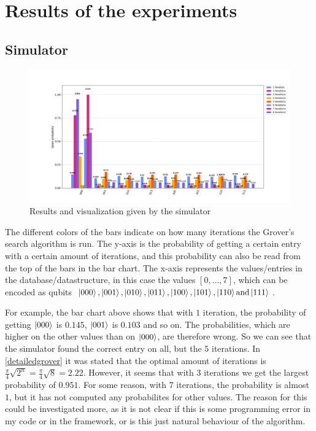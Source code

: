 \documentclass[english,oneside,openright]{UH_DS_report}
\begin{document}
\section{Results of the experiments}
\label{Allresults}

\subsection{Simulator}
\label{simulator}
\begin{figure}[h]
\caption{Results and visualization given by the simulator}
\centering
\includegraphics[width=\linewidth]{images/simulator/Figure_1.png}
\end{figure}

The different colors of the bars indicate on how many iterations the Grover's search algorithm is run. The y-axis is the probability of getting a certain entry with a certain amount of iterations, and this probability can also be read from the top of the bars in the bar chart. The x-axis represents the values/entries in the database/datastructure, in this case the values $[0,\ldots,7]$, which can be encoded as qubits $\ket{000}, \ket{001}, \ket{010}, \ket{011}, \ket{100}, \ket{101}, \ket{110} \text{and} \ket{111}$.

For example, the bar chart above shows that with $1$ iteration, the probability of getting $\ket{000}$ is $0.145$, $\ket{001}$ is $0.103$ and so on. The probabilities, which are higher on the other values than on $\ket{000}$, are therefore wrong. So we can see that the simulator found the correct entry on all, but the $5$ iterations. In \ref{detailedgrover} it was stated that the optimal amount of iterations is $\frac{\pi}{4} \sqrt{2^{n}} = \frac{\pi}{4} \sqrt{8} = 2.22 $. However, it seems that with $3$ iterations we get the largest probability of $0.951$. For some reason, with 7 iterations, the probability is almost $1$, but it has not computed any probabilites for other values. The reason for this could be investigated more, as it is not clear if this is some programming error in my code or in the framework, or is this just natural behaviour of the algorithm.
\end{document}
